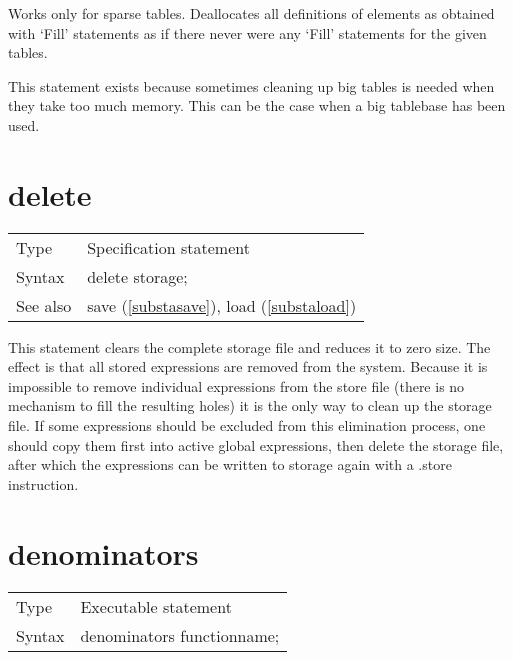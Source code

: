 \noindent Works only for sparse 
tables. Deallocates all definitions of elements as 
obtained with `Fill' statements as if there never were any 
`Fill' statements for the given tables.

This statement exists because sometimes cleaning up big tables is needed 
when they take too much memory. This can be the case when a big tablebase 
has been used. \vspace{10mm}


\section{delete}
\label{substadelete}

\noindent \begin{tabular}{ll}
Type & Specification statement\\
Syntax & delete storage;
\\ See also & save (\ref{substasave}), load (\ref{substaload})
\end{tabular} \vspace{4mm}

\noindent This statement clears the complete 
storage file and 
reduces it to zero size. The effect is that all stored expressions are 
removed from the system. Because it is impossible to remove individual 
expressions from the store file (there is no mechanism to fill the 
resulting holes) it is the only way to clean up the storage file. If some 
expressions should be excluded from this elimination process, one should 
copy them first into active global expressions, then delete the storage 
file, after which the expressions can be written to storage again with a 
.store instruction. \vspace{10mm}


\section{denominators}
\label{substadenominators}

\noindent \begin{tabular}{ll}
Type & Executable statement\\
Syntax & denominators functionname;
\end{tabular} \vspace{4mm}

